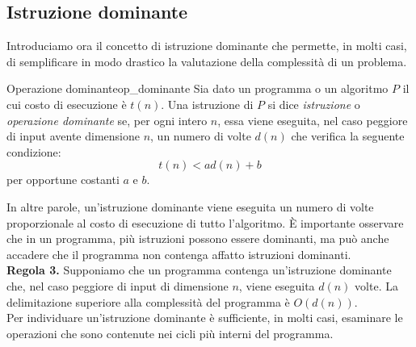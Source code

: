 \documentclass[12pt]{report}
\newcounter{definition}
\newcommand{\nmu}{}
\begin{document}
   	\subsection{Istruzione dominante}
   	Introduciamo ora il concetto di istruzione dominante che permette, in molti casi, di semplificare in modo drastico la valutazione della complessità di un problema. \\
   	\begin{definition}{\nmu Operazione dominante}{op_dominante}
   		Sia dato un programma o un algoritmo $P$ il cui costo di esecuzione è $t(n)$. Una istruzione di $P$ si dice \textit{istruzione} o \textit{operazione dominante} se, per ogni intero $n$, essa viene eseguita, nel caso peggiore di input avente dimensione $n$, un numero di volte $d(n)$ che verifica la seguente condizione:
   		\[
   		t(n) < ad(n) + b
   		\]
   		per opportune costanti $a$ e $b$.
   	\end{definition}
   	In altre parole, un'istruzione dominante viene eseguita un numero di volte proporzionale al costo di esecuzione di tutto l'algoritmo. È importante osservare che in un programma, più istruzioni possono essere dominanti, ma può anche accadere che il programma non contenga affatto istruzioni dominanti. \\
   	\textbf{Regola 3.} Supponiamo che un programma contenga un'istruzione dominante che, nel caso peggiore di input di dimensione $n$, viene eseguita $d(n)$ volte. La delimitazione superiore alla complessità del programma è $O(d(n))$. \\
   	Per individuare un'istruzione dominante è sufficiente, in molti casi, esaminare le operazioni che sono contenute nei cicli più interni del programma.
\end{document}

